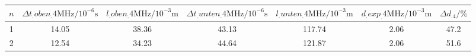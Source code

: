 \label{tab:tabAScan4}
	\begin{tabular}{S[table-format=1.0]S[table-format=2.2]S[table-format=2.2]S[table-format=2.2]S[table-format=2.2]S[table-format=2.2]S[table-format=2.1]}
		\toprule
		{$n$} & {$\Delta t_.{oben_.{4\si{\mega\hertz} } }/10^{-6}\si{\second}$} & {$l_.{oben_.{4\si{\mega\hertz} } }/10^{-3}\si{\metre}$} & {$\Delta t_.{unten_.{4\si{\mega\hertz} } }/10^{-6}\si{\second}$} & {$l_.{unten_.{4\si{\mega\hertz} } }/10^{-3}\si{\metre}$} & {$d_.{exp_.{4\si{\mega\hertz} } }/10^{-3}\si{\metre}$} & {$\Delta d_.4/\%$} \\
		 & 14.05 & 38.36 & 43.13 & 117.74 & 2.06 & 47.2 \\
		2 & 12.54 & 34.23 & 44.64 & 121.87 & 2.06 & 51.6 \\
		\bottomrule
	\end{tabular}
